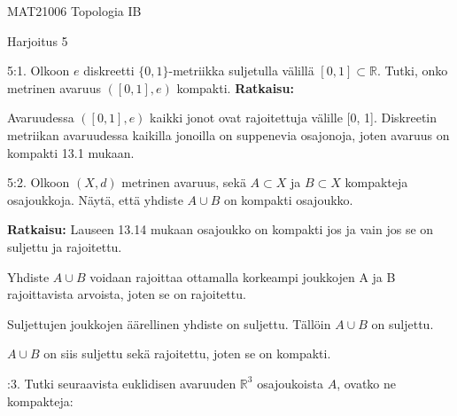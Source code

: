 \documentclass[12pt,a4paper,leqno]{amsart}
\begin{document}
\noindent MAT21006 Topologia IB

\noindent Harjoitus 5 
\begin{comment}
\noindent  Määräaika:  \textbf{torstaina 25.4.2024 klo 23.00 mennessä} 

\bigskip

\noindent Ratkaisut palautetaan sähköisesti määräaikaan mennessä kurssin Moodle sivun viikottaiseen palautusalueeseen yhtenä (1) pdf-lähetyksenä. 

\smallskip

Normaalit ohjausvuorot: tiistaina  klo 14.15-16  salissa  C322 ja  torstaina  klo 14-16 Ratkomossa  (kurssin Topologia IB ohjaaja).
Muina aikoina voi  kysyä  neuvoja tehtäviin Ratkomossa tai kurssin Moodle sivun Keskustelualueissa. Kurssin Topologia IA
Telegram-ryhmä jatkaa. 

\medskip

Aihepiiri: luku 13. \textit{Kompaktisuus} Väisälän kirjasta [V]. 

\bigskip
\end{comment}

5:1.  Olkoon $e$ diskreetti $\{0,1\}$-metriikka suljetulla välillä $[0,1] \subset \mathbb R$. Tutki, onko metrinen avaruus $([0,1], e)$ kompakti.
\textbf{Ratkaisu: }

Avaruudessa $([0, 1], e)$ kaikki jonot ovat rajoitettuja välille [0, 1]. Diskreetin metriikan avaruudessa kaikilla jonoilla on suppenevia osajonoja, joten avaruus on kompakti 13.1 mukaan.

\bigskip

5:2.  Olkoon $(X,d)$ metrinen avaruus, sekä $A \subset X$ ja $B \subset X$ 
kompakteja osajoukkoja. Näytä, että yhdiste $A \cup B$ on kompakti osajoukko.

\textbf{Ratkaisu: }
Lauseen 13.14 mukaan osajoukko on kompakti jos ja vain jos se on suljettu ja rajoitettu.

Yhdiste $A \cup B$  voidaan rajoittaa ottamalla korkeampi joukkojen A ja B rajoittavista arvoista, joten se on rajoitettu.

Suljettujen joukkojen äärellinen yhdiste on suljettu. Tällöin $A \cup B$ on suljettu.

$A \cup B$ on siis suljettu sekä rajoitettu, joten se on kompakti.

\bigskip

:3. Tutki seuraavista euklidisen avaruuden  $\mathbb R^3$ osajoukoista $A$,
ovatko ne  kompakteja:
\end{document}

